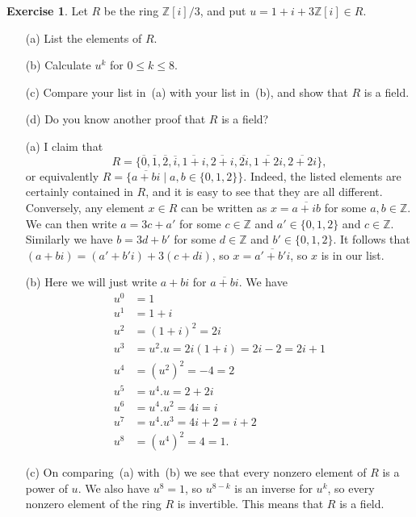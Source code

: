 \documentclass{amsart}
\newcommand{\Z}         {{\mathbb{Z}}}
\newcommand{\ov}[1]     {\overline{#1}}
\newcommand{\st}        {\;|\;}
\newcommand{\ip}[1]     {\langle #1\rangle}
\renewcommand{\:}{\colon}
\theoremstyle{definition}
\newtheorem{exercise}{Exercise}[section]
\renewenvironment{solution}{\SolutionAtEnd}{\endSolutionAtEnd}
\begin{document}
\begin{exercise}
 Let $R$ be the ring $\Z[i]/3$, and put $u=1+i+3\Z[i]\in R$.
 \begin{itemize}
  \item[(a)] List the elements of $R$.
  \item[(b)] Calculate $u^k$ for $0\leq k\leq 8$.
  \item[(c)] Compare your list in~(a) with your list in~(b), and show
   that $R$ is a field.
  \item[(d)] Do you know another proof that $R$ is a field?
 \end{itemize}
\end{exercise}
\begin{solution}
 \begin{itemize}
  \item[(a)] I claim that 
   \[ R=\{\ov{0},\ov{1},\ov{2},
          \ov{i},\ov{1+i},\ov{2+i},
          \ov{2i},\ov{1+2i},\ov{2+2i}\},
   \]
   or equivalently $R=\{\ov{a+bi}\st a,b\in\{0,1,2\}\}$.  Indeed, the
   listed elements are certainly contained in $R$, and it is easy to
   see that they are all different.  Conversely, any element $x\in R$
   can be written as $x=\ov{a+ib}$ for some $a,b\in\Z$.  We can then
   write $a=3c+a'$ for some $c\in\Z$ and $a'\in\{0,1,2\}$ and
   $c\in\Z$.  Similarly we have $b=3d+b'$ for some $d\in\Z$ and
   $b'\in\{0,1,2\}$.  It follows that $(a+bi)=(a'+b'i)+3(c+di)$, so
   $x=\ov{a'+b'i}$, so $x$ is in our list.
  \item[(b)]
   Here we will just write $a+bi$ for $\ov{a+bi}$.  We have
   \begin{align*}
    u^0 &= 1 \\
    u^1 &= 1+i \\
    u^2 &= (1+i)^2 = 2i \\
    u^3 &= u^2.u = 2i(1+i) = 2i-2 = 2i+1 \\
    u^4 &= (u^2)^2 = -4 = 2 \\
    u^5 &= u^4.u = 2+2i \\
    u^6 &= u^4.u^2 = 4i = i \\
    u^7 &= u^4.u^3 = 4i+2 = i+2 \\
    u^8 &= (u^4)^2 = 4 = 1.
   \end{align*}
  \item[(c)] On comparing~(a) with~(b) we see that every nonzero
   element of $R$ is a power of $u$.  We also have $u^8=1$, so
   $u^{8-k}$ is an inverse for $u^k$, so every nonzero element of the
   ring $R$ is invertible.  This means that $R$ is a field.

\end{itemize}
\end{solution}
\end{document}
